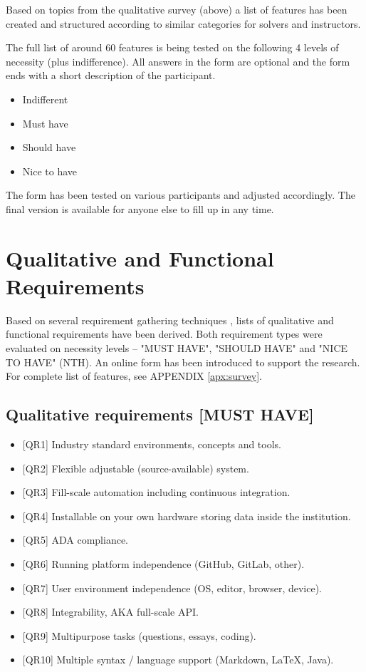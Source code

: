 {Based on topics from the qualitative survey (above) a list of features has been created and structured according to similar categories for solvers and instructors.}

{The full list of around 60 features is being tested on the following 4 levels of necessity (plus indifference). All answers in the form are optional and the form ends with a short description of the participant.}

\begin{itemize}
\item
  {Indifferent}
\item
  {Must have}
\item
  {Should have}
\item
  {Nice to have}
\end{itemize}

{The form has been tested on various participants and adjusted accordingly. The final version is available for anyone else to fill up in any time.}

\section{Qualitative and Functional Requirements} \label{sec:qual}

Based on several requirement gathering techniques \cite{young2002recommended}, lists of qualitative and functional requirements have been derived. Both requirement types were evaluated on necessity levels -- "MUST HAVE", "SHOULD HAVE" and "NICE TO HAVE" (NTH). An online form has been introduced to support the research. For complete list of features, see APPENDIX \ref{apx:survey}.

\subsection{Qualitative requirements {[}MUST HAVE{]}} \label{ssec:qual-must}

\begin{itemize}
\item
  {{[}QR1{]} Industry standard environments, concepts and tools.}
\item
  {{[}QR2{]} }{Flexible adjustable (source-available) system.}
\item
  {{[}QR3{]} Fill-scale }{automation including continuous integration.}
\item
  {{[}QR4{]} }{Installable on your own hardware storing data inside the institution.}
\item
  {{[}QR5{]} ADA compliance.}
\item
  {{[}QR6{]} Running platform independence (GitHub, GitLab, other).}
\item
  {{[}QR7{]} User environment independence (OS, editor, browser, device).}
\item
  {{[}QR8{]} Integrability, AKA full-scale API.}
\item
  {{[}QR9{]} Multipurpose tasks (questions, essays, coding).}
\item
  {{[}QR10{]} Multiple syntax / language support (Markdown, LaTeX, Java).}
\end{itemize}

